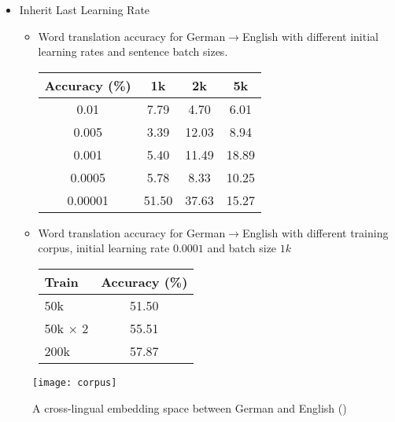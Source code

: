 \begin{itemize}
\begin{itemize}
		
	\end{itemize}
	\item Inherit Last Learning Rate
	\begin{itemize}
		\item Word translation accuracy for German$\rightarrow$English with different initial learning rates and sentence batch sizes.\\
		\begin{table}[H]
			\centering
			\begin{tabular}{cccc}
				\hline
				Accuracy (\%) & 1k   & 2k   & 5k      \\ \hline
				0.01          & 7.79  & 4.70  & 6.01 \\ \hline
				0.005       & 3.39 & 12.03 & 8.94 \\ \hline
				0.001        & 5.40 & 11.49 & 18.89 \\ \hline
				0.0005          & 5.78  & 8.33  & 10.25 \\ \hline
				0.00001        & 51.50 & 37.63 & 15.27 \\ \hline
			\end{tabular}
		\end{table}	
		\item Word translation accuracy for German$\rightarrow$English with different training corpus, initial learning rate $0.0001$ and batch size $1k$\\
		\begin{table}[H]
			\centering
			\begin{tabular}{lc}
				\hline
				Train & Accuracy (\%) \\ \hline
				50k   & 51.50         \\ \hline
				50k $\times$ 2 & 55.51         \\ \hline
				200k  & 57.87         \\ \hline
			\end{tabular}
		\end{table}
	\end{itemize}

	

\end{itemize}

\begin{figure}[H]
	\texttt{[image: corpus]}
	\centering
	\caption{A cross-lingual embedding space between German and English (\cite{ruder2017survey})}
\end{figure}


